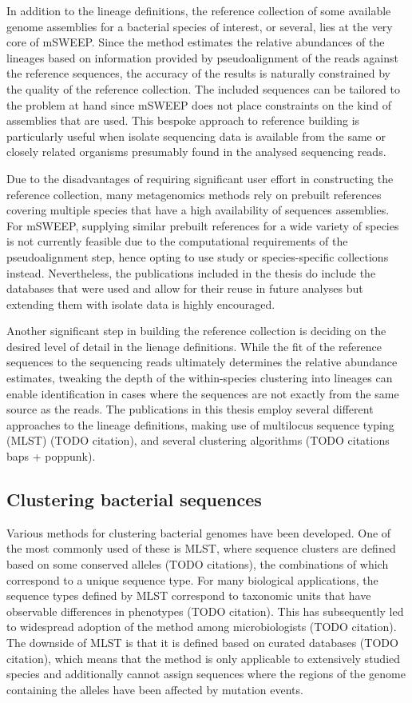 \documentclass[officiallayout]{tktla}
\begin{document}
In addition to the lineage definitions, the reference collection of
some available genome assemblies for a bacterial species of interest,
or several, lies at the very core of mSWEEP. Since the method
estimates the relative abundances of the lineages based on information
provided by pseudoalignment of the reads against the reference
sequences, the accuracy of the results is naturally constrained by the
quality of the reference collection. The included sequences can be
tailored to the problem at hand since mSWEEP does not place
constraints on the kind of assemblies that are used. This bespoke
approach to reference building is particularly useful when isolate
sequencing data is available from the same or closely related
organisms presumably found in the analysed sequencing reads.

Due to the disadvantages of requiring significant user effort in
constructing the reference collection, many metagenomics methods rely
on prebuilt references covering multiple species that have a high
availability of sequences assemblies. For mSWEEP, supplying similar
prebuilt references for a wide variety of species is not currently
feasible due to the computational requirements of the pseudoalignment
step, hence opting to use study or species-specific collections
instead. Nevertheless, the publications included in the thesis do
include the databases that were used and allow for their reuse in
future analyses but extending them with isolate data is highly
encouraged.

Another significant step in building the reference collection is
deciding on the desired level of detail in the lienage
definitions. While the fit of the reference sequences to the
sequencing reads ultimately determines the relative abundance
estimates, tweaking the depth of the within-species clustering into
lineages can enable identification in cases where the sequences are
not exactly from the same source as the reads. The publications in
this thesis employ several different approaches to the lineage
definitions, making use of multilocus sequence typing (MLST) (TODO
citation), and several clustering algorithms (TODO citations baps +
poppunk).

\subsection{Clustering bacterial sequences}

Various methods for clustering bacterial genomes have been
developed. One of the most commonly used of these is MLST, where
sequence clusters are defined based on some conserved alleles (TODO
citations), the combinations of which correspond to a unique sequence
type. For many biological applications, the sequence types defined by
MLST correspond to taxonomic units that have observable differences in
phenotypes (TODO citation). This has subsequently led to widespread
adoption of the method among microbiologists (TODO citation). The
downside of MLST is that it is defined based on curated databases
(TODO citation), which means that the method is only applicable to
extensively studied species and additionally cannot assign sequences
where the regions of the genome containing the alleles have been
affected by mutation events.
\end{document}
